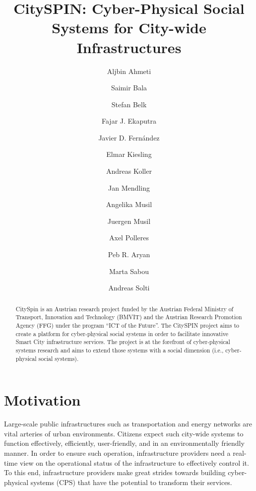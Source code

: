 \documentclass[runningheads,a4paper]{llncs}
\begin{document}
\mainmatter

\title{CitySPIN: Cyber-Physical Social Systems for City-wide Infrastructures}
\author{Aljbin Ahmeti \and
Saimir Bala \and
Stefan Belk \and
Fajar J. Ekaputra \and
Javier D. Fernández \and
Elmar Kiesling \and
Andreas Koller \and
Jan Mendling \and
Angelika Musil \and
Juergen Musil \and
Axel Polleres \and
Peb R. Aryan \and
Marta Sabou \and
Andreas Solti}
\maketitle

\begin{abstract}
CitySpin is an Austrian research project funded by the Austrian Federal Ministry of Transport, Innovation and Technology (BMVIT) and the Austrian Research Promotion Agency (FFG) under the program ``ICT of the Future''. The CitySPIN project aims to create a platform for cyber-physical social systems in order to facilitate innovative Smart City infrastructure services. The project is at the forefront of cyber-physical systems research and aims to extend those systems with a social dimension (i.e., cyber-physical social systems).

\end{abstract}


\section{Motivation}

Large-scale public infrastructures such as transportation and energy networks are vital arteries of urban environments. Citizens expect such city-wide systems to function effectively, efficiently, user-friendly, and in an environmentally friendly manner. In order to ensure such operation, infrastructure providers need a real-time view on the operational status of the infrastructure to effectively control it. To this end, infrastructure providers make great strides towards building cyber-physical systems (CPS)  \cite{__RefHeading__217_247691834} that have the potential to transform their services. 
\end{document}
